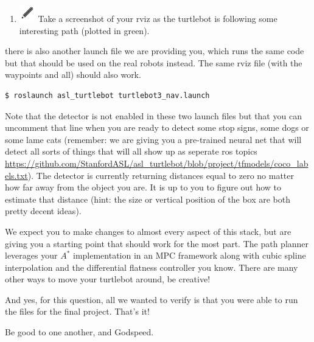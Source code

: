 \begin{enumerate}[label=(\roman*)]
\item \includegraphics[scale=0.6]{write.png} 
Take a screenshot of your rviz as the turtlebot is following some interesting path (plotted in green).
\end{enumerate}

there is also another launch file we are providing you, which runs the same code but that should be used on the real robots instead. The same rviz file (with the waypoints and all) should also work.

\begin{lstlisting}
$ roslaunch asl_turtlebot turtlebot3_nav.launch
\end{lstlisting}

Note that the detector is not enabled in these two launch files but that you can uncomment that line when you are ready to detect some stop signs, some dogs or some lame cats (remember: we are giving you a pre-trained neural net that will detect all sorts of things that will all show up as seperate ros topics \url{https://github.com/StanfordASL/asl_turtlebot/blob/project/tfmodels/coco_labels.txt}). The detector is currently returning distances equal to zero no matter how far away from the object you are. It is up to you to figure out how to estimate that distance (hint: the size or vertical position of the box are both pretty decent ideas). 

We expect you to make changes to almost every aspect of this stack, but are giving you a starting point that should work for the most part. The path planner leverages your $A^*$ implementation in an MPC framework along with cubic spline interpolation and the differential flatness controller you know. There are many other ways to move your turtlebot around, be creative!

And yes, for this question, all we wanted to verify is that you were able to run the files for the final project. That's it! 

Be good to one another, and Godspeed.

\newpage